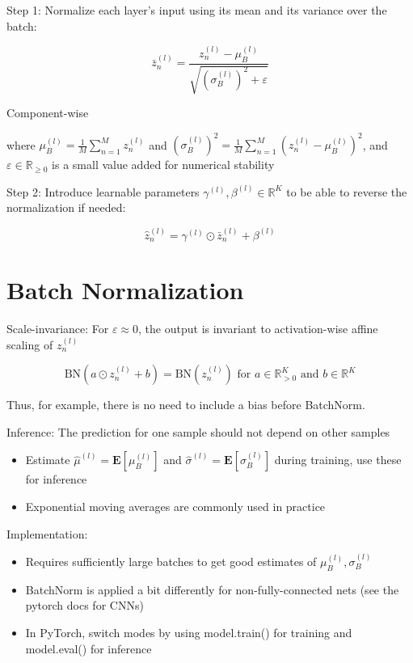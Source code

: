 \documentclass[10pt]{article}
\begin{document}
Step 1: Normalize each layer's input using its mean and its variance over the batch:

$$
\bar{z}_{n}^{(l)}=\frac{z_{n}^{(l)}-\mu_{B}^{(l)}}{\sqrt{\left(\sigma_{B}^{(l)}\right)^{2}+\varepsilon}}
$$

Component-wise

where $\mu_{B}^{(l)}=\frac{1}{M} \sum_{n=1}^{M} z_{n}^{(l)}$ and $\left(\sigma_{B}^{(l)}\right)^{2}=\frac{1}{M} \sum_{n=1}^{M}\left(z_{n}^{(l)}-\mu_{B}^{(l)}\right)^{2}$, and $\varepsilon \in \mathbb{R}_{\geq 0}$ is a small value added for numerical stability

Step 2: Introduce learnable parameters $\gamma^{(l)}, \beta^{(l)} \in \mathbb{R}^{K}$ to be able to reverse the normalization if needed:

$$
\hat{z}_{n}^{(l)}=\gamma^{(l)} \odot \bar{z}_{n}^{(l)}+\beta^{(l)}
$$

\section*{Batch Normalization}
Scale-invariance: For $\varepsilon \approx 0$, the output is invariant to activation-wise affine scaling of $z_{n}^{(l)}$

$$
\mathrm{BN}\left(a \odot z_{n}^{(l)}+b\right)=\mathrm{BN}\left(z_{n}^{(l)}\right) \text { for } a \in \mathbb{R}_{>0}^{K} \text { and } b \in \mathbb{R}^{K}
$$

Thus, for example, there is no need to include a bias before BatchNorm.

Inference: The prediction for one sample should not depend on other samples

\begin{itemize}
  \item Estimate $\hat{\mu}^{(l)}=\mathbf{E}\left[\mu_{B}^{(l)}\right]$ and $\hat{\sigma}^{(l)}=\mathbf{E}\left[\sigma_{B}^{(l)}\right]$ during training, use these for inference
  \item Exponential moving averages are commonly used in practice
\end{itemize}

Implementation:

\begin{itemize}
  \item Requires sufficiently large batches to get good estimates of $\mu_{B}^{(l)}, \sigma_{B}^{(l)}$
  \item BatchNorm is applied a bit differently for non-fully-connected nets (see the pytorch docs for CNNs)
  \item In PyTorch, switch modes by using model.train() for training and model.eval() for inference
\end{itemize}
\end{document}
